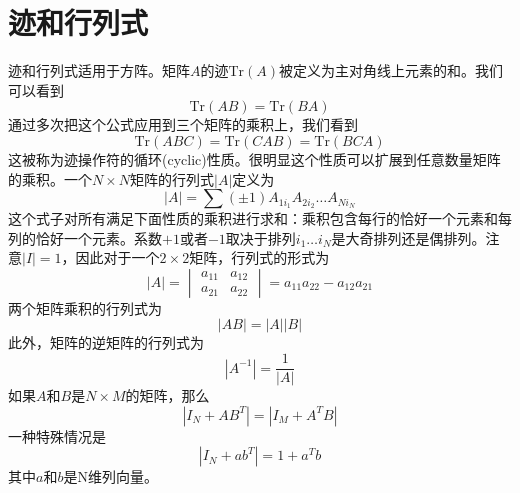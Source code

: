 \section{迹和行列式}
迹和行列式适用于方阵。矩阵$A$的迹$\mathrm{Tr}(A)$被定义为主对角线上元素的和。我们可以看到
\begin{equation}
	\mathrm{Tr}(AB)=\mathrm{Tr}(BA)
\end{equation}
通过多次把这个公式应用到三个矩阵的乘积上，我们看到
\begin{equation}
	\mathrm{Tr}(ABC)=\mathrm{Tr}(CAB)=\mathrm{Tr}(BCA)
\end{equation}
这被称为迹操作符的循环(cyclic)性质。很明显这个性质可以扩展到任意数量矩阵的乘积。一个$N\times N$矩阵的行列式$|A|$定义为
\begin{equation}
	|A|=\sum (\pm 1)A_{1i_1}A_{2i_2}\dots A_{Ni_N}
\end{equation}
这个式子对所有满足下面性质的乘积进行求和：乘积包含每行的恰好一个元素和每列的恰好一个元素。系数$+1$或者$-1$取决于排列$i_1\dots i_N$是大奇排列还是偶排列。注意$|I|=1$，因此对于一个$2\times 2$矩阵，行列式的形式为
\begin{equation}
	|A|=\begin{vmatrix}
		a_{11}&a_{12}\\
		a_{21}&a_{22}
	\end{vmatrix}
	=a_{11}a_{22}-a_{12}a_{21}
\end{equation}
两个矩阵乘积的行列式为
\begin{equation}
\label{c12}
	|AB|=|A||B|
\end{equation}
此外，矩阵的逆矩阵的行列式为
\begin{equation}
	|A^{-1}|=\frac{1}{|A|}
\end{equation}
如果$A$和$B$是$N\times M$的矩阵，那么 
\begin{equation}
	|I_N+AB^T|=|I_M+A^TB|
\end{equation}
一种特殊情况是
\begin{equation}
	|I_N+ab^T|=1+a^Tb
\end{equation}
其中$a$和$b$是N维列向量。
